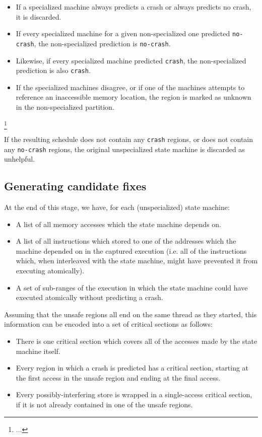 \documentclass[10pt,twocolumn,preprint,natbib,authoryear]{sigplanconf}
\newcommand{\editorial}[1]{\textcolor{red}{\footnote{\textcolor{red}{#1}}}}
\begin{document}
\begin{itemize}
\item If a specialized machine always predicts a crash or always
  predicts no crash, it is discarded.
\item If every specialized machine for a given non-specialized one
  predicted \verb|no-crash|, the non-specialized prediction is
  \verb|no-crash|.
\item Likewise, if every specialized machine predicted \verb|crash|,
  the non-specialized prediction is also \verb|crash|.
\item If the specialized machines disagree, or if one of the machines
  attempts to reference an inaccessible memory location, the region is
  marked as unknown in the non-specialized partition.
\end{itemize}\editorial{...}

If the resulting schedule does not contain any \verb|crash| regions,
or does not contain any \verb|no-crash| regions, the original
unspecialized state machine is discarded as unhelpful.

\subsection{Generating candidate fixes}
\label{sect:gen_fix}

At the end of this stage, we have, for each (unspecialized) state machine:

\begin{itemize}
\item A list of all memory accesses which the state machine depends
  on.
\item A list of all instructions which stored to one of the addresses
  which the machine depended on in the captured execution (i.e. all of
  the instructions which, when interleaved with the state machine,
  might have prevented it from executing atomically).
\item A set of sub-ranges of the execution in which the state machine
  could have executed atomically without predicting a crash.
\end{itemize}

Assuming that the unsafe regions all end on the same thread as they
started, this information can be encoded into a set of critical
sections as follows:

\begin{itemize}
\item There is one critical section which covers all of the accesses
  made by the state machine itself.
\item Every region in which a crash is predicted has a critical
  section, starting at the first access in the unsafe region and
  ending at the final access.
\item Every possibly-interfering store is wrapped in a single-access
  critical section, if it is not already contained in one of the
  unsafe regions.
\end{itemize}
\end{document}
